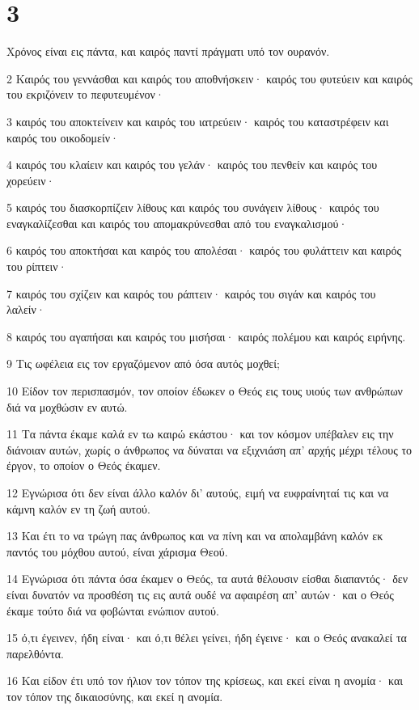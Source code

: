 \chapter{3}

\par Χρόνος είναι εις πάντα, και καιρός παντί πράγματι υπό τον ουρανόν.
\par 2 Καιρός του γεννάσθαι και καιρός του αποθνήσκειν· καιρός του φυτεύειν και καιρός του εκριζόνειν το πεφυτευμένον·
\par 3 καιρός του αποκτείνειν και καιρός του ιατρεύειν· καιρός του καταστρέφειν και καιρός του οικοδομείν·
\par 4 καιρός του κλαίειν και καιρός του γελάν· καιρός του πενθείν και καιρός του χορεύειν·
\par 5 καιρός του διασκορπίζειν λίθους και καιρός του συνάγειν λίθους· καιρός του εναγκαλίζεσθαι και καιρός του απομακρύνεσθαι από του εναγκαλισμού·
\par 6 καιρός του αποκτήσαι και καιρός του απολέσαι· καιρός του φυλάττειν και καιρός του ρίπτειν·
\par 7 καιρός του σχίζειν και καιρός του ράπτειν· καιρός του σιγάν και καιρός του λαλείν·
\par 8 καιρός του αγαπήσαι και καιρός του μισήσαι· καιρός πολέμου και καιρός ειρήνης.
\par 9 Τις ωφέλεια εις τον εργαζόμενον από όσα αυτός μοχθεί;
\par 10 Είδον τον περισπασμόν, τον οποίον έδωκεν ο Θεός εις τους υιούς των ανθρώπων διά να μοχθώσιν εν αυτώ.
\par 11 Τα πάντα έκαμε καλά εν τω καιρώ εκάστου· και τον κόσμον υπέβαλεν εις την διάνοιαν αυτών, χωρίς ο άνθρωπος να δύναται να εξιχνιάση απ' αρχής μέχρι τέλους το έργον, το οποίον ο Θεός έκαμεν.
\par 12 Εγνώρισα ότι δεν είναι άλλο καλόν δι' αυτούς, ειμή να ευφραίνηταί τις και να κάμνη καλόν εν τη ζωή αυτού.
\par 13 Και έτι το να τρώγη πας άνθρωπος και να πίνη και να απολαμβάνη καλόν εκ παντός του μόχθου αυτού, είναι χάρισμα Θεού.
\par 14 Εγνώρισα ότι πάντα όσα έκαμεν ο Θεός, τα αυτά θέλουσιν είσθαι διαπαντός· δεν είναι δυνατόν να προσθέση τις εις αυτά ουδέ να αφαιρέση απ' αυτών· και ο Θεός έκαμε τούτο διά να φοβώνται ενώπιον αυτού.
\par 15 ό,τι έγεινεν, ήδη είναι· και ό,τι θέλει γείνει, ήδη έγεινε· και ο Θεός ανακαλεί τα παρελθόντα.
\par 16 Και είδον έτι υπό τον ήλιον τον τόπον της κρίσεως, και εκεί είναι η ανομία· και τον τόπον της δικαιοσύνης, και εκεί η ανομία.
